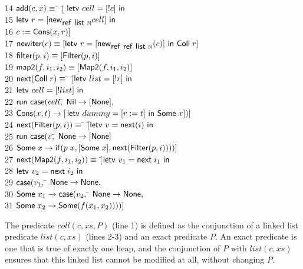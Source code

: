 \documentclass[preprint,natbib]{sigplanconf}
\begin{document}
{\begin{tabbing}
14 \> $\mbox{\textsf{{add}}}(c, x) \equiv$ \=
          $[$\= $\mbox{\textsf{{letv }}}cell = [!c]\mbox{\textsf{{ in }}}$ \\
15 \> \> \> $\mbox{\textsf{{letv }}}r = [\mbox{\textsf{{new}}}_{\mbox{\textsf{{ref }}}\mbox{\textsf{{list }}}{\mathbb{N}}} cell]\mbox{\textsf{{ in }}}$ \\
16 \> \> \> $c := \mbox{\textsf{{Cons}}}(x, r)]$
\\[0.5em]
17 \> $\mbox{\textsf{{new}}}\mbox{\textsf{{iter}}}(c) \equiv 
   [\mbox{\textsf{{letv }}}r = [\mbox{\textsf{{new}}}_{\mbox{\textsf{{ref }}}\mbox{\textsf{{ref }}}\mbox{\textsf{{list }}}{\mathbb{N}}} (c)]\mbox{\textsf{{ in }}}\mbox{\textsf{{Coll}}}\;r]$ 
\\[0.5em]
18 \> $\mbox{\textsf{{filter}}}(p, i) \equiv [\mbox{\textsf{{Filter}}}(p, i)]$ 
\\[0.5em]
19 \> $\mbox{\textsf{{map2}}}(f, i_1, i_2) \equiv [\mbox{\textsf{{Map2}}}(f, i_1, i_2)]$ 
\\[0.5em]
20 \> $\mbox{\textsf{{next}}}(\mbox{\textsf{{Coll}}}\;r) \equiv$ \=
       $[$\=$\mbox{\textsf{{letv }}}list = [!r]\mbox{\textsf{{ in }}}$ \\
21 \>\>\>$\mbox{\textsf{{letv }}}cell = [!list]\mbox{\textsf{{ in }}}$ \\
22 \>\> \>$\mbox{\textsf{{run }}}{}\mbox{\textsf{{case}}}(cell,$\=
            $\mbox{\textsf{{Nil}}} \to [\mbox{\textsf{{None}}}],$ \\
23 \>\>\>\> $\mbox{\textsf{{Cons}}}(x, t) \to [$\=$\mbox{\textsf{{letv }}}dummy = [r := t]\mbox{\textsf{{ in }}}\mbox{\textsf{{Some}}}\;x])]$ \\
24 \> $\mbox{\textsf{{next}}}(\mbox{\textsf{{Filter}}}(p, i)) \equiv$ \= 
        $[$\=$\mbox{\textsf{{letv }}}v = \mbox{\textsf{{next}}}(i)\mbox{\textsf{{ in }}}$ \\
25 \>\>\>$\mbox{\textsf{{run }}}{}\mbox{\textsf{{case}}}(v,$\=
            $\mbox{\textsf{{None}}} \to [\mbox{\textsf{{None}}}]$ \\
26 \>\>\>\> $\mbox{\textsf{{Some}}}\;x \to \mbox{\textsf{{if}}}(p\;x,[\mbox{\textsf{{Some}}}\; x],
                                         \mbox{\textsf{{next}}}(\mbox{\textsf{{Filter}}}(p, i))))]$
\\
27 \> $\mbox{\textsf{{next}}}(\mbox{\textsf{{Map2}}}(f, i_1, i_2)) \equiv$ 
$[$\=$\mbox{\textsf{{letv }}}v_1 = \mbox{\textsf{{next}}}\;i_1\mbox{\textsf{{ in }}}$ \\
28 \>\>$\mbox{\textsf{{letv }}}v_2 = \mbox{\textsf{{next}}}\;i_2\mbox{\textsf{{ in }}}$ \\
29 \>\>$\mbox{\textsf{{case}}}(v_1,$ \= 
            $\mbox{\textsf{{None}}} \to \mbox{\textsf{{None}}},$ \\
30 \>\>\> $\mbox{\textsf{{Some}}}\;x_1 \to \mbox{\textsf{{case}}}(v_2,$ \=
              $\mbox{\textsf{{None}}} \to \mbox{\textsf{{None}}},$ \\
31 \>\>\>\> $\mbox{\textsf{{Some}}}\;x_2 \to \mbox{\textsf{{Some}}}(f(x_1, x_2))))]$\\
\end{tabbing}
}
The predicate $coll(c, xs, P)$ (line 1) is defined as the conjunction
of a linked list predicate $list(c, xs)$ (lines 2-3) and an exact
predicate $P$. An exact predicate is one that is true of exactly one
heap, and the conjunction of $P$ with $list(c,xs)$ ensures that this
linked list cannot be modified at all, without changing $P$.
\end{document}
